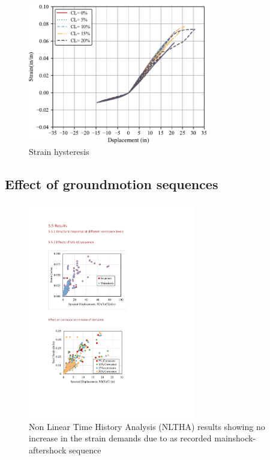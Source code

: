 \begin{figure}[htbp]
	\centering
	\includegraphics[width=0.7\textwidth]{Chapter-5/figs/Diplacement_Strain_RSN1505.pdf}
	\caption{Strain hysteresis}
	\label{fig:Steel_Stress_Strain_Response}
\end{figure}

\subsection{Effect of groundmotion sequences}

\begin{figure}[htbp]
	\centering
	\includegraphics[width=0.65\textwidth]{VAC Thesis 2.0/Chapter-5/figs/MS_AS_results_noincrease_in_demands.pdf}
	\caption{Non Linear Time History Analysis (NLTHA) results showing no increase in the strain demands due to as recorded mainshock-aftershock sequence}
	\label{fig:ms_as_results}
\end{figure}

